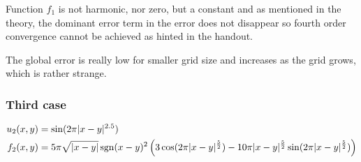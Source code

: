 \documentclass[main.tex]{subfiles}
\begin{document}
Function $f_1$ is not harmonic, nor zero, but a constant and as mentioned in the theory, the dominant error term in the error does not disappear so fourth order convergence cannot be achieved as hinted in the handout.

The global error is really low for smaller grid size and increases as the grid grows, which is rather strange.

\subsubsection*{Third case}
\begin{align}
    u_{2}(x,y) &= \sin(2 \pi |x-y|^{2.5}) \\
    f_2(x,y) &= 5 \pi \sqrt{|x-y|} \operatorname{sgn}(x-y)^2 \left(3 \cos(2 \pi |x-y|^{\frac{5}{2}}) - 10 \pi |x-y|^{\frac{5}{2}} \sin(2 \pi |x-y|^{\frac{5}{2}}) \right)
\end{align}
\end{document}
